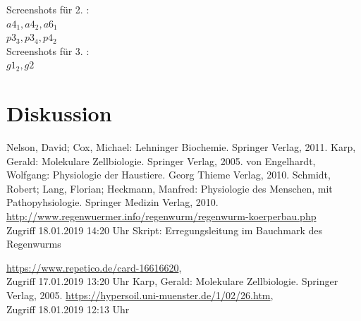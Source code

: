 \documentclass[11pt]{article}
\begin{document}
Screenshots für 2. : \\
$a4_1, a4_2, a6_1$ \\
$p3_3, p3_4, p4_2 $\\

Screenshots für 3. : \\
$g1_2, g2$ \\

\section{Diskussion}

\begin{thebibliography}{999}
 Nelson, David; Cox, Michael: Lehninger Biochemie. Springer Verlag, 2011.
 Karp, Gerald: Molekulare Zellbiologie. Springer Verlag, 2005.
 von Engelhardt, Wolfgang: Physiologie der Haustiere. Georg Thieme Verlag, 2010. 
 Schmidt, Robert; Lang, Florian; Heckmann, Manfred: Physiologie des Menschen, mit Pathopyhsiologie. Springer Medizin Verlag, 2010. 
 \url{http://www.regenwuermer.info/regenwurm/regenwurm-koerperbau.php} \\Zugriff 18.01.2019 14:20 Uhr
 Skript: Erregungsleitung im Bauchmark des Regenwurms

 \url{https://www.repetico.de/card-16616620}, \\Zugriff 17.01.2019 13:20 Uhr
 Karp, Gerald: Molekulare Zellbiologie. Springer Verlag, 2005.
 \url{https://hypersoil.uni-muenster.de/1/02/26.htm}, \\Zugriff 18.01.2019 12:13 Uhr
\end{thebibliography}
\end{document}
